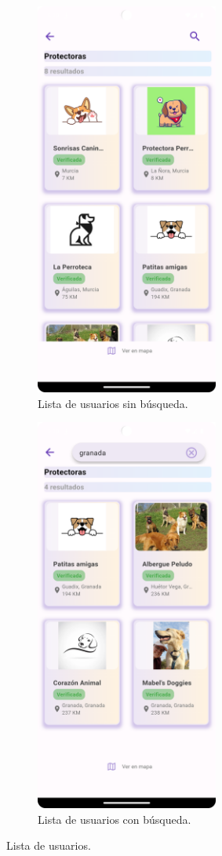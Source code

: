 \documentclass[a4paper, 12pt]{article}
\begin{document}
\begin{figure}[H]
   	\begin{subfigure}{0.48\textwidth}
		\begin{center}
			{\includegraphics[width=6cm]{app/UserList.png}\par}
			\caption{Lista de usuarios sin búsqueda.}
		\end{center}  
	\end{subfigure}\hfill
   	\begin{subfigure}{0.48\textwidth}
		\begin{center}
			{\includegraphics[width=6cm]{app/UserListSearch.png}\par}
			\caption{Lista de usuarios con búsqueda.}
		\end{center}  
	\end{subfigure}\hfill
	\caption{Lista de usuarios.}
\end{figure}
\end{document}
